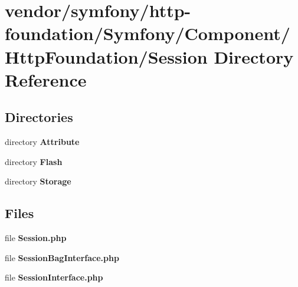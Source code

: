 \section{vendor/symfony/http-\/foundation/\+Symfony/\+Component/\+Http\+Foundation/\+Session Directory Reference}
\label{dir_8914c437cb33ed6ff6d14a50bd1d926c}
\subsection*{Directories}
\begin{DoxyCompactItemize}
\item 
directory {\bf Attribute}
\item 
directory {\bf Flash}
\item 
directory {\bf Storage}
\end{DoxyCompactItemize}
\subsection*{Files}
\begin{DoxyCompactItemize}
\item 
file {\bf Session.\+php}
\item 
file {\bf Session\+Bag\+Interface.\+php}
\item 
file {\bf Session\+Interface.\+php}
\end{DoxyCompactItemize}
